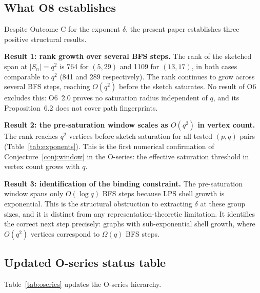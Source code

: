 \documentclass[11pt,a4paper]{article}
\theoremstyle{definition}
\theoremstyle{remark}
\begin{document}
  \subsection{What O8 establishes}
    \label{sec:interpretation-positive}

    Despite Outcome C for the exponent $\delta$, the present paper establishes three
    positive structural results.

    \medskip
    \noindent
    \textbf{Result 1: rank growth over several BFS steps.}
    The rank of the sketched span at $|S_n| = q^2$ is 764 for $(5,29)$ and 1109 for
    $(13,17)$, in both cases comparable to $q^2$ (841 and 289 respectively).
    The rank continues to grow across several BFS steps, reaching $O(q^2)$ before the sketch
    saturates.
    No result of O6 excludes this: O6~2.0 proves no saturation radius independent of $q$, and
    its Proposition~6.2 does not cover path fingerprints.

    \medskip
    \noindent
    \textbf{Result 2: the pre-saturation window scales as $O(q^2)$ in vertex count.}
    The rank reaches $q^2$ vertices before sketch saturation for all tested $(p,q)$ pairs
    (Table~\ref{tab:exponents}).
    This is the first numerical confirmation of Conjecture~\ref{conj:window} in the
    O-series: the effective saturation threshold in vertex count grows with $q$.

    \medskip
    \noindent
    \textbf{Result 3: identification of the binding constraint.}
    The pre-saturation window spans only $O(\log q)$ BFS steps because LPS shell growth
    is exponential.
    This is the structural obstruction to extracting $\delta$ at these group sizes,
    and it is distinct from any representation-theoretic limitation.
    It identifies the correct next step precisely: graphs with sub-exponential shell
    growth, where $O(q^2)$ vertices correspond to $\Omega(q)$ BFS steps.

  \subsection{Updated O-series status table}
    \label{sec:interpretation-table}

    Table~\ref{tab:oseries} updates the O-series hierarchy.
\end{document}

